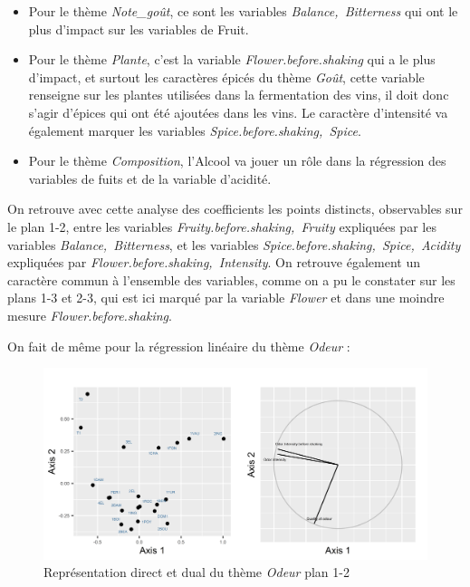 \documentclass[a4paper,french,10pt]{article}
\begin{document}
\begin{itemize}
	\item Pour le thème \textit{Note\_goût}, ce sont les variables \textit{Balance,~Bitterness} qui ont le plus d'impact sur les variables de Fruit.
	\item Pour le thème \textit{Plante}, c'est la variable \textit{Flower.before.shaking} qui a le plus d'impact, et surtout les caractères épicés du thème \textit{Goût}, cette variable renseigne sur les plantes utilisées dans la fermentation des vins, il doit donc s'agir d'épices qui ont été ajoutées dans les vins. Le caractère d'intensité va également marquer les variables \textit{Spice.before.shaking,~Spice}.
	\item Pour le thème \textit{Composition}, l'Alcool va jouer un rôle dans la régression des variables de fuits et de la variable d'acidité. 
\end{itemize}
\bigskip

On retrouve avec cette analyse des coefficients les points distincts, observables sur le plan 1-2, entre les variables \textit{Fruity.before.shaking,~Fruity} expliquées par les variables \textit{Balance,~Bitterness}, et les variables \textit{Spice.before.shaking,~Spice,~Acidity} expliquées par \textit{Flower.before.shaking,~Intensity}. On retrouve également un caractère commun à l'ensemble des variables, comme on a pu le constater sur les plans 1-3 et 2-3, qui est ici marqué par la variable \textit{Flower} et dans une moindre mesure \textit{Flower.before.shaking}. \newline

On fait de même pour la régression linéaire du thème \textit{Odeur} : 

\begin{figure}[htp] 
	\centering
	\includegraphics[scale=0.8]{images/Plot.IndVar_B1_1.2.png}
	\caption{Représentation direct et dual du thème \textit{Odeur} plan 1-2}
\end{figure}
\end{document}
